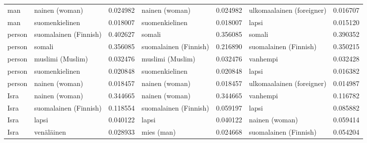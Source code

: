 \begin{longtable}{llrlrlr}
    man &            nainen (woman) &                         0.024982 &            nainen (woman) &                              0.024982 & ulkomaalainen (foreigner) &                        0.016707 \\
    man &            suomenkielinen &                         0.018007 &            suomenkielinen &                              0.018007 &                     lapsi &                        0.015120 \\
 person &     suomalainen (Finnish) &                         0.402627 &                    somali &                              0.356085 &                    somali &                        0.390352 \\
 person &                    somali &                         0.356085 &     suomalainen (Finnish) &                              0.216890 &     suomalainen (Finnish) &                        0.350215 \\
 person &          muslimi (Muslim) &                         0.032476 &          muslimi (Muslim) &                              0.032476 &                  vanhempi &                        0.032428 \\
 person &            suomenkielinen &                         0.020848 &            suomenkielinen &                              0.020848 &                     lapsi &                        0.016382 \\
 person &            nainen (woman) &                         0.018457 &            nainen (woman) &                              0.018457 & ulkomaalainen (foreigner) &                        0.014987 \\
   Isra &            nainen (woman) &                         0.344665 &            nainen (woman) &                              0.344665 &                  vanhempi &                        0.116782 \\
   Isra &     suomalainen (Finnish) &                         0.118554 &     suomalainen (Finnish) &                              0.059197 &                     lapsi &                        0.085882 \\
   Isra &                     lapsi &                         0.040122 &                     lapsi &                              0.040122 &            nainen (woman) &                        0.059414 \\
   Isra &                venäläinen &                         0.028933 &                mies (man) &                              0.024668 &     suomalainen (Finnish) &                        0.054204 \\

\end{longtable}

